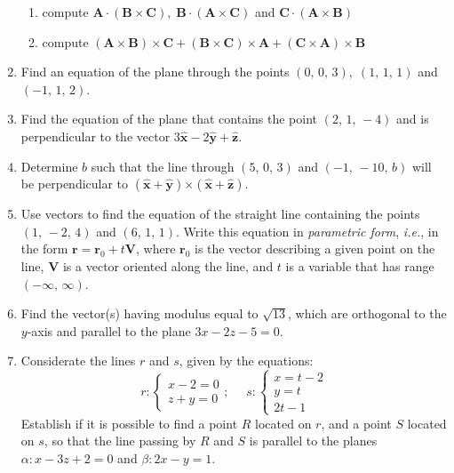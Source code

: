 \documentclass{article}
\begin{document}
\begin{enumerate}
\begin{enumerate}
\item compute $\mathbf{A\cdot }\left( \mathbf{B\times C}\right) ,\;\mathbf{B\cdot }\left( \mathbf{A\times C}\right) $ and $\mathbf{C\cdot }\left( \mathbf{A\times B}\right)$

\item compute $\left( \mathbf{A\times B}\right) \times \mathbf{C+}\left( \mathbf{B\times C}\right) \times \mathbf{A+}\left( \mathbf{C\times A}\right) \times \mathbf{B}$
\end{enumerate}


\item Find an equation of the plane through the points $\left(
0,\,0,\,3\right) ,\;\left( 1,\,1,\,1\right) $ and $\left( -1,\,1,\,2\right) $.

\item Find the equation of the plane that contains the point $\left(
2,\,1,\,-4\right) $ and is perpendicular to the vector $3\mathbf{\hat{x}}-2\mathbf{\hat{y}}+\mathbf{\hat{z}}.$

\item Determine $b$ such that the line through $\left( 5,\,0,\,3\right) $ and $\left( -1,\,-10,\,b\right) $ will be perpendicular to $\left( \mathbf{\hat{x}+\hat{y}}\right) \mathbf{\times }\left( \mathbf{\hat{x}+\hat{z}}\right)$.

\item Use vectors to find the equation of the straight line containing the points $\left( 1,\,-2,\,4\right) $ and $\left( 6,\,1,\,1\right) .$ Write this equation in \emph{parametric form}, {\it i.e.}, in the form $\mathbf{r}= \mathbf{r}_{0}+t\mathbf{V}$, where $\mathbf{r}_{0}$ is the vector describing a given point on the line, $\mathbf{V}$ is a vector oriented along the line, and $t$ is a variable that has range $\left( -\infty ,\,\infty \right)$. 

\item 
Find the vector(s) having modulus equal to $\sqrt{13}$, which are orthogonal to the $y$-axis and parallel to the plane $3x - 2z -5=0$.

\item 
Considerate the lines $r$ and $s$, given by the  equations: 
\begin{equation}
r: 
\begin{cases} x-2= 0 \\ z+y=0    \end{cases} ; ~~~~~~   s: \begin{cases} x = t - 2  \\ y=t \\ 2t- 1   \end{cases}   
\end{equation}
Establish if it is possible to find a point $R$ located on $r$, and a point $S$ located on $s$, so that the line passing by $R$ and $S$ 
is parallel to the planes 
$\alpha : x - 3z + 2 = 0$ and  $\beta : 2x - y = 1$.


\end{enumerate}
\end{document}
